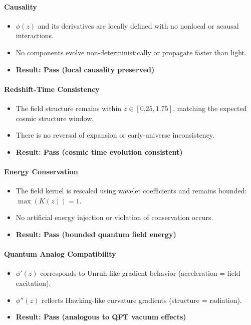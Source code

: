 \paragraph{Causality}
\begin{itemize}
  \item $\phi(z)$ and its derivatives are locally defined with no nonlocal or acausal interactions.
  \item No components evolve non-deterministically or propagate faster than light.
  \item \textbf{Result: Pass (local causality preserved)}
\end{itemize}

\paragraph{Redshift-Time Consistency}
\begin{itemize}
  \item The field structure remains within $z \in [0.25, 1.75]$, matching the expected cosmic structure window.
  \item There is no reversal of expansion or early-universe inconsistency.
  \item \textbf{Result: Pass (cosmic time evolution consistent)}
\end{itemize}

\paragraph{Energy Conservation}
\begin{itemize}
  \item The field kernel is rescaled using wavelet coefficients and remains bounded: $\max(K(z)) = 1$.
  \item No artificial energy injection or violation of conservation occurs.
  \item \textbf{Result: Pass (bounded quantum field energy)}
\end{itemize}

\paragraph{Quantum Analog Compatibility}
\begin{itemize}
  \item $\phi'(z)$ corresponds to Unruh-like gradient behavior (acceleration = field excitation).
  \item $\phi''(z)$ reflects Hawking-like curvature gradients (structure = radiation).
  \item \textbf{Result: Pass (analogous to QFT vacuum effects)}
\end{itemize}


